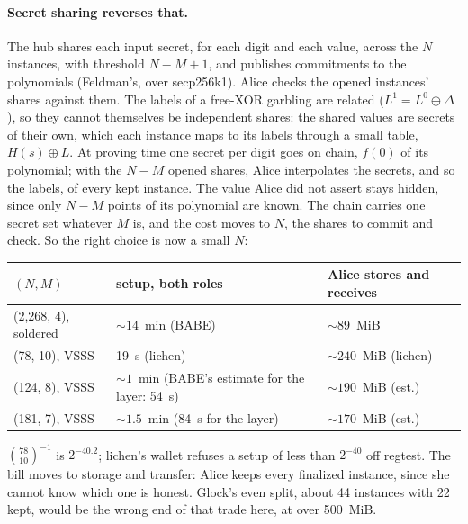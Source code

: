 \documentclass[11pt]{article}
\begin{document}
\paragraph{Secret sharing reverses that.} The hub shares each input
secret, for each digit and each value, across the $N$ instances, with
threshold $N - M + 1$, and publishes commitments to the polynomials
(Feldman's, over secp256k1). Alice checks the opened instances' shares
against them. The labels of a free-XOR garbling are related
($L^1 = L^0 \oplus \Delta$), so they cannot themselves be independent
shares: the shared values are secrets of their own, which each instance
maps to its labels through a small table, $H(s) \oplus L$. At proving
time one secret per digit goes on chain, $f(0)$ of its polynomial; with
the $N - M$ opened shares, Alice interpolates the secrets, and so the
labels, of every kept instance. The value Alice did not
assert stays hidden, since only $N - M$ points of its polynomial are
known. The chain carries one secret set whatever $M$ is, and the cost
moves to $N$, the shares to commit and check. So the right choice is
now a small $N$:
\begin{center}
\small
\begin{tabularx}{\linewidth}{>{\raggedright\arraybackslash}p{30mm}LL}
\toprule
$(N, M)$ & setup, both roles & Alice stores and receives \\
\midrule
(2,268, 4), soldered & ${\sim}14$~min (BABE) & ${\sim}89$~MiB \\
(78, 10), VSSS & 19~s (lichen) & ${\sim}240$~MiB (lichen) \\
(124, 8), VSSS & ${\sim}1$~min (BABE's estimate for the layer: 54~s) & ${\sim}190$~MiB (est.) \\
(181, 7), VSSS & ${\sim}1.5$~min (84~s for the layer) & ${\sim}170$~MiB (est.) \\
\bottomrule
\end{tabularx}
\end{center}
$\binom{78}{10}^{-1}$ is $2^{-40.2}$; lichen's wallet refuses a setup of
less than $2^{-40}$ off regtest. The bill moves to storage and transfer:
Alice keeps every finalized instance, since she cannot know which one is
honest. Glock's even split, about 44 instances with 22 kept, would be
the wrong end of that trade here, at over 500~MiB.
\end{document}
